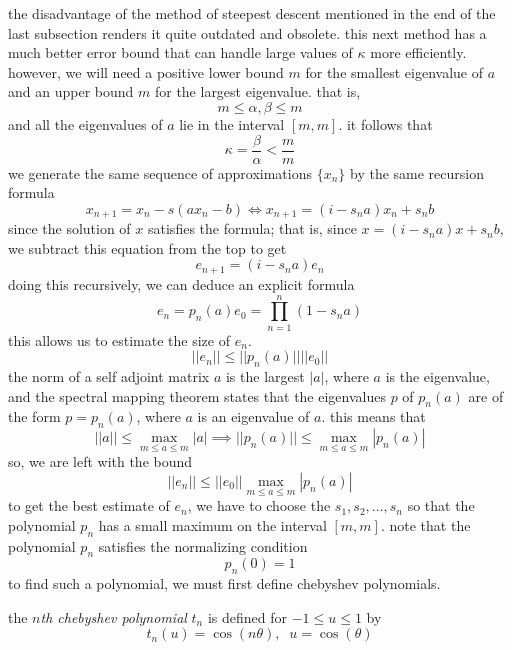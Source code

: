 \documentclass{article}
\begin{document}
    the disadvantage of the method of steepest descent mentioned in the end of the last subsection renders it quite outdated and obsolete. this next method has a much better error bound that can handle large values of $\kappa$ more efficiently. however, we will need a positive lower bound $m$ for the smallest eigenvalue of $a$ and an upper bound $m$ for the largest eigenvalue. that is, 
    \[m \leq \alpha, \beta \leq m\]
    and all the eigenvalues of $a$ lie in the interval $[m, m]$. it follows that
    \[\kappa = \frac{\beta}{\alpha} < \frac{m}{m}\]
    we generate the same sequence of approximations $\{x_n\}$ by the same recursion formula
    \[x_{n+1} = x_n - s(a x_n - b) \iff x_{n+1} = (i - s_n a) x_n + s_n b\]
    since the solution of $x$ satisfies the formula; that is, since $x = (i - s_n a) x + s_n b$, we subtract this equation from the top to get
    \[e_{n+1} = (i - s_n a) e_n\]
    doing this recursively, we can deduce an explicit formula 
    \[e_n = p_n (a) e_0 = \prod_{n=1}^n (1 - s_n a)\]
    this allows us to estimate the size of $e_n$. 
    \[||e_n|| \leq ||p_n (a)|| ||e_0||\]
    the norm of a self adjoint matrix $a$ is the largest $|a|$, where $a$ is the eigenvalue, and the spectral mapping theorem states that the eigenvalues $p$ of $p_n (a)$ are of the form $p = p_n (a)$, where $a$ is an eigenvalue of $a$. this means that
    \[||a|| \leq \max_{m \leq a \leq m} |a| \implies ||p_n (a)|| \leq \max_{m \leq a \leq m} |p_n (a)|\]
    so, we are left with the bound
    \[||e_n|| \leq ||e_0|| \max_{m \leq a \leq m} |p_n (a)|\]
    to get the best estimate of $e_n$, we have to choose the $s_1, s_2, ..., s_n$ so that the polynomial $p_n$ has a small maximum on the interval $[m, m]$. note that the polynomial $p_n$ satisfies the normalizing condition 
    \[p_n(0) = 1\]
    to find such a polynomial, we must first define chebyshev polynomials. 

    \begin{definition}
    the \textit{$n$th chebyshev polynomial} $t_n$ is defined for $-1 \leq u \leq 1$ by
    \[t_n (u) = \cos (n \theta), \;\; u = \cos(\theta)\]
    \end{definition}
\end{document}
